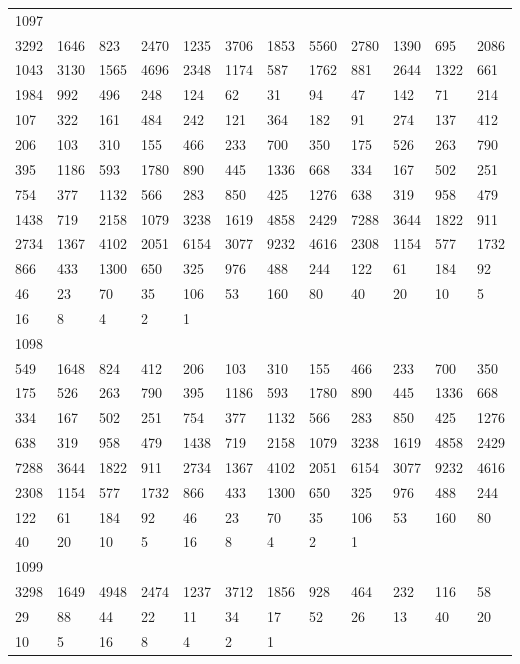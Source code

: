 \begin{longtable}{llllllllllll}
1097&&&&&&&&&&&\\
3292& 1646& 823& 2470& 1235& 3706& 1853& 5560& 2780& 1390& 695& 2086\\
1043& 3130& 1565& 4696& 2348& 1174& 587& 1762& 881& 2644& 1322& 661\\
1984& 992& 496& 248& 124& 62& 31& 94& 47& 142& 71& 214\\
107& 322& 161& 484& 242& 121& 364& 182& 91& 274& 137& 412\\
206& 103& 310& 155& 466& 233& 700& 350& 175& 526& 263& 790\\
395& 1186& 593& 1780& 890& 445& 1336& 668& 334& 167& 502& 251\\
754& 377& 1132& 566& 283& 850& 425& 1276& 638& 319& 958& 479\\
1438& 719& 2158& 1079& 3238& 1619& 4858& 2429& 7288& 3644& 1822& 911\\
2734& 1367& 4102& 2051& 6154& 3077& 9232& 4616& 2308& 1154& 577& 1732\\
866& 433& 1300& 650& 325& 976& 488& 244& 122& 61& 184& 92\\
46& 23& 70& 35& 106& 53& 160& 80& 40& 20& 10& 5\\
16& 8& 4& 2& 1& \\

1098&&&&&&&&&&&\\
549& 1648& 824& 412& 206& 103& 310& 155& 466& 233& 700& 350\\
175& 526& 263& 790& 395& 1186& 593& 1780& 890& 445& 1336& 668\\
334& 167& 502& 251& 754& 377& 1132& 566& 283& 850& 425& 1276\\
638& 319& 958& 479& 1438& 719& 2158& 1079& 3238& 1619& 4858& 2429\\
7288& 3644& 1822& 911& 2734& 1367& 4102& 2051& 6154& 3077& 9232& 4616\\
2308& 1154& 577& 1732& 866& 433& 1300& 650& 325& 976& 488& 244\\
122& 61& 184& 92& 46& 23& 70& 35& 106& 53& 160& 80\\
40& 20& 10& 5& 16& 8& 4& 2& 1& \\

1099&&&&&&&&&&&\\
3298& 1649& 4948& 2474& 1237& 3712& 1856& 928& 464& 232& 116& 58\\
29& 88& 44& 22& 11& 34& 17& 52& 26& 13& 40& 20\\
10& 5& 16& 8& 4& 2& 1& \\


\end{longtable}
